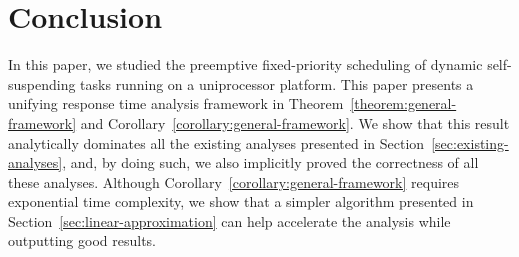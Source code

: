 \documentclass[conference]{IEEEtran}
\begin{document}




























\section{Conclusion}
\label{sec:conclusion}


In this paper, we studied the preemptive fixed-priority scheduling of
dynamic self-suspending tasks running on a uniprocessor platform. This
paper presents a unifying response time analysis framework in
Theorem~\ref{theorem:general-framework} and
Corollary~\ref{corollary:general-framework}. We show that this result
analytically dominates all the existing analyses presented in
Section~\ref{sec:existing-analyses}, and, by doing such, we also implicitly
proved the correctness of all these analyses. Although
Corollary~\ref{corollary:general-framework} requires exponential time
complexity, we show that a simpler algorithm presented in Section~\ref{sec:linear-approximation} can help accelerate the analysis while outputting good results.

\end{document}

